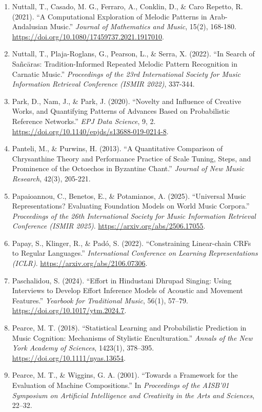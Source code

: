 \documentclass[11pt,a4paper]{article}
\begin{document}
\begin{enumerate}
\item
 Nuttall, T., Casado, M. G., Ferraro, A., Conklin, D., \& Caro Repetto, R. (2021). ``A Computational Exploration of Melodic Patterns in Arab-Andalusian Music.'' \emph{Journal of Mathematics and Music}, 15(2), 168-180. \url{https://doi.org/10.1080/17459737.2021.1917010}.
\item
 Nuttall, T., Plaja-Roglans, G., Pearson, L., \& Serra, X. (2022). ``In Search of Sañcāras: Tradition-Informed Repeated Melodic Pattern Recognition in Carnatic Music.'' \emph{Proceedings of the 23rd International Society for Music Information Retrieval Conference (ISMIR 2022)}, 337-344.
\item
 Park, D., Nam, J., \& Park, J. (2020). ``Novelty and Influence of Creative Works, and Quantifying Patterns of Advances Based on Probabilistic Reference Networks.'' \emph{EPJ Data Science}, 9, 2. \url{https://doi.org/10.1140/epjds/s13688-019-0214-8}.
\item
 Panteli, M., \& Purwins, H. (2013). ``A Quantitative Comparison of Chrysanthine Theory and Performance Practice of Scale Tuning, Steps, and Prominence of the Octoechos in Byzantine Chant.'' \emph{Journal of New Music Research}, 42(3), 205-221.
\item
 Papaioannou, C., Benetos, E., \& Potamianos, A. (2025). ``Universal Music Representations? Evaluating Foundation Models on World Music Corpora.'' \emph{Proceedings of the 26th International Society for Music Information Retrieval Conference (ISMIR 2025)}. \url{https://arxiv.org/abs/2506.17055}.
\item
 Papay, S., Klinger, R., \& Padó, S. (2022). ``Constraining Linear-chain CRFs to Regular Languages.'' \emph{International Conference on Learning Representations (ICLR)}. \url{https://arxiv.org/abs/2106.07306}.
\item
 Paschalidou, S. (2024). ``Effort in Hindustani Dhrupad Singing: Using Interviews to Develop Effort Inference Models of Acoustic and Movement Features.'' \emph{Yearbook for Traditional Music}, 56(1), 57--79. \url{https://doi.org/10.1017/ytm.2024.7}.
\item
 Pearce, M. T. (2018). ``Statistical Learning and Probabilistic Prediction in Music Cognition: Mechanisms of Stylistic Enculturation.'' \emph{Annals of the New York Academy of Sciences}, 1423(1), 378--395. \url{https://doi.org/10.1111/nyas.13654}.
\item
 Pearce, M. T., \& Wiggins, G. A. (2001). ``Towards a Framework for the Evaluation of Machine Compositions.'' In \emph{Proceedings of the AISB'01 Symposium on Artificial Intelligence and Creativity in the Arts and Sciences}, 22--32.

\end{enumerate}
\end{document}
